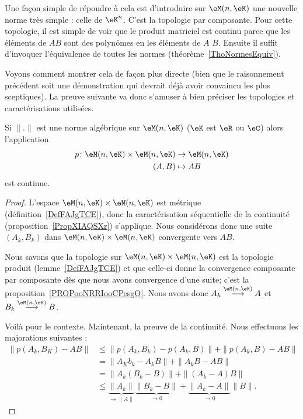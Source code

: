 Une façon simple de répondre à cela est d'introduire sur \( \eM(n,\eK)\) une nouvelle norme très simple : celle de \( \eK^n\). C'est la topologie par composante. Pour cette topologie, il est simple de voir que le produit matriciel est continu parce que les éléments de \( AB\) sont des polynômes en les éléments de \( A\) \( B\). Ensuite il suffit d'invoquer l'équivalence de toutes les normes (théorème~\ref{ThoNormesEquiv}).

Voyons comment montrer cela de façon plus directe (bien que le raisonnement précédent soit une démonstration qui devrait déjà avoir convaincu les plus sceptiques). La preuve suivante va donc s'amuser à bien préciser les topologies et caractérisations utilisées.

\begin{lemma}
    Si \( \| . \|\) est une norme algébrique sur \( \eM(n,\eK)\) (\( \eK\) est \( \eR\) ou \( \eC\)) alors l'application
    \begin{equation}
        \begin{aligned}
            p\colon \eM(n,\eK)\times \eM(n,\eK)&\to \eM(n,\eK) \\
            (A,B)&\mapsto AB
        \end{aligned}
    \end{equation}
    est continue.
\end{lemma}

\begin{proof}
    L'espace \( \eM(n,\eK)\times \eM(n,\eK)\) est métrique (définition~\ref{DefFAJgTCE}), donc la caractérisation séquentielle de la continuité (proposition~\ref{PropXIAQSXr}) s'applique. Nous considérons donc une suite \( (A_k,B_k)\) dans \( \eM(n,\eK)\times \eM(n,\eK)\) convergente vers \( AB\).

    Nous savons que la topologie sur \( \eM(n,\eK)\times \eM(n,\eK)\) est la topologie produit (lemme~\ref{DefFAJgTCE}) et que celle-ci donne la convergence composante par composante dès que nous avons convergence d'une suite; c'est la proposition~\ref{PROPooNRRIooCPesgO}. Nous avons donc \( A_k\stackrel{\eM(n,\eK)}{\longrightarrow}A\) et \( B_k\stackrel{\eM(n,\eK)}{\longrightarrow}B\).

    Voilà pour le contexte. Maintenant, la preuve de la continuité. Nous effectuons les majorations suivantes :
    \begin{subequations}
        \begin{align}
            \| p(A_k,B_K)-AB \|&\leq \| p(A_k,B_k)-p(A_k,B) \|+\| p(A_k,B)-AB \|\\
            &=\| A_Kb_k-A_kB \|+\| A_kB-AB \|\\
            &=\| A_k(B_k-B) \|+\| (A_k-A)B \|\\
            &\leq \underbrace{\| A_k \|}_{\to \| A \|}\underbrace{\| B_k-B \|}_{\to 0}+\underbrace{\| A_k-A \|}_{\to 0}\| B \|.
        \end{align}
    \end{subequations}
\end{proof}

